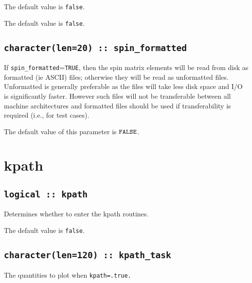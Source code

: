 The default value is \verb#false#.


The default value is \verb#false#.

\subsection[spin\_formated]{\tt character(len=20) :: spin\_formatted}

If \verb#spin_formatted#=\verb#TRUE#, then the spin matrix elements will be
read from disk as formatted (ie ASCII) files; otherwise they will be
read as unformatted files. Unformatted is generally preferable as the
files will take less disk space and I/O is significantly
faster. However such files will not be transferable between all
machine architectures and formatted files should be used if
transferability is required (i.e., for test cases).

The default value of this parameter is $\verb#FALSE#$.


\clearpage
\section{kpath}

\subsection[berry]{\tt logical :: kpath}
Determines whether to enter the kpath routines.

The default value is \verb#false#.


\subsection[kpath\_task]{\tt character(len=120) ::  kpath\_task} 
The quantities to plot when {\tt kpath=.true.} 


